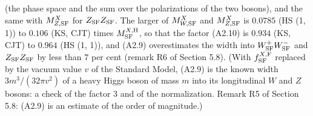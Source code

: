 \documentclass[
  10pt,
]{article}
\begin{document}
(the phase space and the sum over the polarizations of the two bosons),
and the same with \(M^X_{Z,{\rm SF}}\) for \(Z_{\rm SF}Z_{\rm SF}\). The
larger of \(M^X_{W,{\rm SF}}\) and \(M^X_{Z,{\rm SF}}\) is \(0.0785\)
(HS (1, 1)) to \(0.106\) (KS, CJT) times \(M^{X,{\rm H}}_{\rm SF}\), so
that the factor (A2.10) is \(0.934\) (KS, CJT) to \(0.964\) (HS (1, 1)),
and (A2.9) overestimates the width into \(W^+_{\rm SF}W^-_{\rm SF}\) and
\(Z_{\rm SF}Z_{\rm SF}\) by less than \(7\) per cent (remark R6 of
Section 5.8). (With \(f^{X,{\rm F}}_{\rm SF}\) replaced by the vacuum
value \(v\) of the Standard Model, (A2.9) is the known width
\(3m^3/(32\pi v^2)\) of a heavy Higgs boson of mass \(m\) into its
longitudinal \(W\) and \(Z\) bosons: a check of the factor 3 and of the
normalization. Remark R5 of Section 5.8: (A2.9) is an estimate of the
order of magnitude.)
\end{document}
